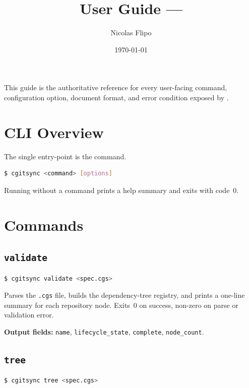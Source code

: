 \documentclass[11pt,a4paper]{article}
\title{User Guide --- \cgspkg{} \cgsversion}
\author{Nicolas Flipo}
\date{\today}
\begin{document}
\maketitle

This guide is the authoritative reference for every user-facing command,
configuration option, document format, and error condition exposed by
\cgspkg{}.

\section{CLI Overview}

The single entry-point is the \cgscli{} command.

\begin{lstlisting}[language=bash]
$ cgitsync <command> [options]
\end{lstlisting}

Running \cgscli{} without a command prints a help summary and exits with
code~0.

\section{Commands}

\subsection{\texttt{validate}}

\begin{lstlisting}[language=bash]
$ cgitsync validate <spec.cgs>
\end{lstlisting}

Parses the \texttt{.cgs} file, builds the dependency-tree registry, and
prints a one-line summary for each repository node. Exits~0 on success,
non-zero on parse or validation error.

\textbf{Output fields:} \texttt{name}, \texttt{lifecycle\_state},
\texttt{complete}, \texttt{node\_count}.

\subsection{\texttt{tree}}

\begin{lstlisting}[language=bash]
$ cgitsync tree <spec.cgs>
\end{lstlisting}
\end{document}
